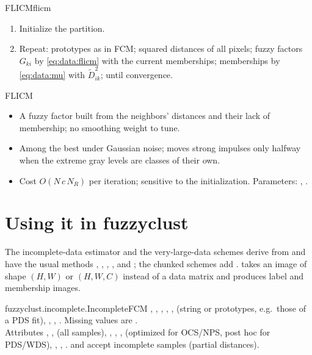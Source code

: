 \begin{algobox}{FLICM}{flicm}
\begin{enumerate}[leftmargin=*]
  \item Initialize the partition.
  \item Repeat: prototypes as in FCM; squared distances of all pixels; fuzzy factors $G_{ki}$ by \eqref{eq:data:flicm} with the current memberships; memberships by \eqref{eq:data:mu} with $\tilde D^2_{ik}$; until convergence.
\end{enumerate}
\end{algobox}
\begin{summarybox}{FLICM}
\begin{itemize}
  \item A fuzzy factor built from the neighbors' distances and their lack of membership; no smoothing weight to tune.
  \item Among the best under Gaussian noise; moves strong impulses only halfway when the extreme gray levels are classes of their own.
  \item Cost $O(N\,c\,N_R)$ per iteration; sensitive to the initialization. Parameters: , .
\end{itemize}
\end{summarybox}

\section{Using it in fuzzyclust}\label{sec:data:api}

The incomplete-data estimator and the very-large-data schemes derive from  and have the usual methods , , , , and ; the chunked schemes add .  takes an image of shape $(H,W)$ or $(H,W,C)$ instead of a data matrix and produces label and membership images.

\begin{apibox}{fuzzyclust.incomplete.IncompleteFCM}
, , , , ,  (string or prototypes, e.g.\ those of a PDS fit), , , . Missing values are .\\
Attributes , ,  (all samples), , , ,  (optimized for OCS/NPS, post hoc for PDS/WDS), , , .  and  accept incomplete samples (partial distances).
\end{apibox}

